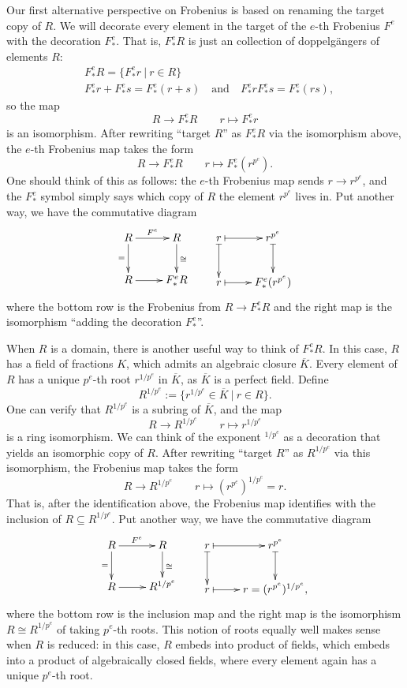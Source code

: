 \documentclass[12pt]{amsart}
\theoremstyle{definition}
\numberwithin{equation}{theorem}
\def\to{\longrightarrow}
\def\mapsto{\longmapsto}
\begin{document}
Our first alternative perspective on Frobenius is based on renaming the target copy of $R$. We will decorate every element in the target of the $e$-th Frobenius $F^e$ with the decoration $F^e_*$. That is, $F^e_*R$ is just an collection of doppelg\"{a}ngers of elements $R$:
\[\begin{aligned} &F^e_*R = \{ F^e_*r \ | \ r\in R\} \\
&F^e_*r + F^e_*s = F^e_*(r+s) \quad \text{and} \quad  F^e_*r  F^e_*s = F^e_*(rs), \end{aligned}\]
so the map 
\[ R \to F^e_*R \qquad r\mapsto F^e_*r\]
is an isomorphism.  After rewriting ``target $R$'' as $F^e_*R$ via the isomorphism above, the $e$-th Frobenius map takes the form
\[ R \to F^e_*R \qquad r\mapsto F^e_*(r^{p^e}).\]
One should think of this as follows: the $e$-th Frobenius map sends $r\to r^{p^e}$, and the $F^e_*$ symbol simply says which copy of $R$  the element $r^{p^e}$ lives in.
Put another way, we have the commutative diagram
\[ \xymatrix{ R \ar[d]_-{=} \ar[r]^-{F^e}  & R \ar[d]^{\cong} \\ R \ar[r]^-{} & F^e_*R} \qquad  \xymatrix{ r \ar@{|->}[r]  \ar@{|->}[d] & r^{p^e}  \ar@{|->}[d] \\ r  \ar@{|->}[r] &F^e_*(r^{p^e})} \]
where the bottom row is the Frobenius from $R \to F^e_*R$ and the right map is the isomorphism ``adding the decoration $F^e_*$''.

When $R$ is a domain, there is another useful way to think of $F^e_*R$. In this case, $R$ has a field of fractions $K$, which admits an algebraic closure $\overline{K}$. Every element of $R$ has a unique $p^e$-th root $r^{1/p^e}$ in $\overline{K}$, as $\overline{K}$ is a perfect field. Define
\[ R^{1/p^e} := \{ r^{1/p^e}\in \overline{K} \ | \ r\in R\}.\]
One can verify that $R^{1/p^e}$ is a subring of $\overline{K}$, and the map
\[ R \to R^{1/p^e} \qquad r\mapsto r^{1/p^e}\]
is a ring isomorphism. We can think of the exponent ${}^{1/p^e}$ as a decoration that yields an isomorphic copy of $R$. After rewriting ``target $R$'' as $R^{1/p^e}$ via this isomorphism, the Frobenius map takes the form
\[ R \to R^{1/p^e} \qquad r\mapsto (r^{p^e})^{1/p^e} = r.\]
That is, after the identification above, the Frobenius map identifies with the inclusion of ${R\subseteq R^{1/p^e}}$. Put another way, we have the commutative diagram
\[ \xymatrix{ R \ar[d]_-{=} \ar[r]^-{F^e}  & R \ar[d]^{\cong} \\ R \ar[r]^-{} & R^{1/p^e}} \qquad  \xymatrix{ r \ar@{|->}[r]  \ar@{|->}[d] & r^{p^e}  \ar@{|->}[d] \\ r  \ar@{|->}[r] &r = (r^{p^e})^{1/p^e},} \]
where the bottom row is the inclusion map and the right map is the isomorphism $R \cong R^{1/p^e}$ of taking $p^e$-th roots. This notion of roots equally well makes sense when $R$ is reduced: in this case, $R$ embeds into product of fields, which embeds into a product of algebraically closed fields, where every element again has a unique $p^e$-th root.
\end{document}
